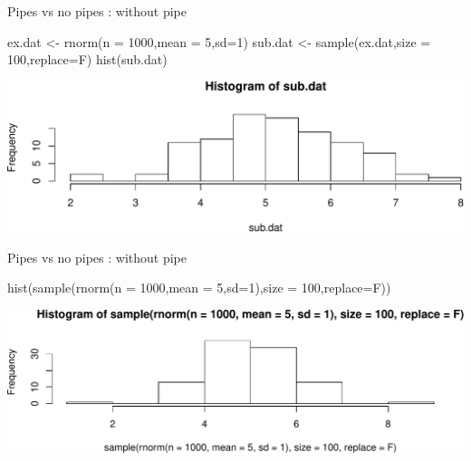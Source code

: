 \documentclass[14pt,ignorenonframetext,]{bredelebeamer}
\newenvironment{Shaded}{\begin{snugshade}}{\end{snugshade}}
\newcommand{\KeywordTok}[1]{\textcolor[rgb]{0.94,0.87,0.69}{#1}}
\newcommand{\DataTypeTok}[1]{\textcolor[rgb]{0.87,0.87,0.75}{#1}}
\newcommand{\DecValTok}[1]{\textcolor[rgb]{0.86,0.86,0.80}{#1}}
\newcommand{\StringTok}[1]{\textcolor[rgb]{0.80,0.58,0.58}{#1}}
\newcommand{\NormalTok}[1]{\textcolor[rgb]{0.80,0.80,0.80}{#1}}
\begin{document}
\begin{frame}[fragile]{Pipes vs no pipes : without pipe}

\begin{Shaded}
\begin{Highlighting}[]
\NormalTok{ex.dat <-}\StringTok{ }\KeywordTok{rnorm}\NormalTok{(}\DataTypeTok{n =} \DecValTok{1000}\NormalTok{,}\DataTypeTok{mean =} \DecValTok{5}\NormalTok{,}\DataTypeTok{sd=}\DecValTok{1}\NormalTok{)}
\NormalTok{sub.dat <-}\StringTok{ }\KeywordTok{sample}\NormalTok{(ex.dat,}\DataTypeTok{size =} \DecValTok{100}\NormalTok{,}\DataTypeTok{replace=}\NormalTok{F)}
\KeywordTok{hist}\NormalTok{(sub.dat)}
\end{Highlighting}
\end{Shaded}

\includegraphics{tidyverse_28_03_files/figure-beamer/unnamed-chunk-9-1.pdf}

\end{frame}

\begin{frame}[fragile]{Pipes vs no pipes : without pipe}

\begin{Shaded}
\begin{Highlighting}[]
\KeywordTok{hist}\NormalTok{(}\KeywordTok{sample}\NormalTok{(}\KeywordTok{rnorm}\NormalTok{(}\DataTypeTok{n =} \DecValTok{1000}\NormalTok{,}\DataTypeTok{mean =} \DecValTok{5}\NormalTok{,}\DataTypeTok{sd=}\DecValTok{1}\NormalTok{),}\DataTypeTok{size =} \DecValTok{100}\NormalTok{,}\DataTypeTok{replace=}\NormalTok{F))}
\end{Highlighting}
\end{Shaded}

\includegraphics{tidyverse_28_03_files/figure-beamer/unnamed-chunk-10-1.pdf}

\end{frame}
\end{document}
